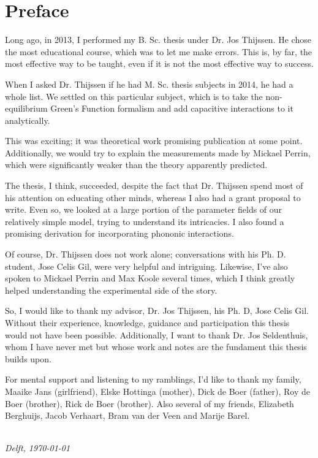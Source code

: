 \chapter*{Preface}

Long ago, in 2013, I performed my B. Sc. thesis under Dr. Jos Thijssen. He chose the most educational course, which was to let me make errors. This is, by far, the most effective way to be taught, even if it is not the most effective way to success.

When I asked Dr. Thijssen if he had M. Sc. thesis subjects in 2014, he had a whole list. We settled on this particular subject, which is to take the non-equilibrium Green's Function formalism and add capacitive interactions to it analytically.

This was exciting; it was theoretical work promising publication at some point. Additionally, we would try to explain the measurements made by Mickael Perrin, which were significantly weaker than the theory apparently predicted.

The thesis, I think, succeeded, despite the fact that Dr. Thijssen spend most of his attention on educating other minds, whereas I also had a grant proposal to write. Even so, we looked at a large portion of the parameter fields of our relatively simple model, trying to understand its intricacies. I also found a promising derivation for incorporating phononic interactions.

Of course, Dr. Thijssen does not work alone; conversations with his Ph. D. student, Jose Celis Gil, were very helpful and intriguing. Likewise, I've also spoken to Mickael Perrin and Max Koole several times, which I think greatly helped understanding the experimental side of the story. 

So, I would like to thank my advisor, Dr. Jos Thijssen, his Ph. D, Jose Celis Gil. Without their experience, knowledge, guidance and participation this thesis would not have been possible. Additionally, I want to thank Dr. Jos Seldenthuis, whom I have never met but whose work and notes are the fundament this thesis builds upon.

For mental support and listening to my ramblings, I'd like to thank my family, Maaike Jans (girlfriend), Elske Hottinga (mother), Dick de Boer (father), Roy de Boer (brother), Rick de Boer (brother). Also several of my friends, Elizabeth Berghuijs, Jacob Verhaart, Bram van der Veen and Marije Barel. 


\begin{flushright}
{\makeatletter\itshape
    \@firstname\ \@lastname \\
    Delft, \today
\makeatother}
\end{flushright}

